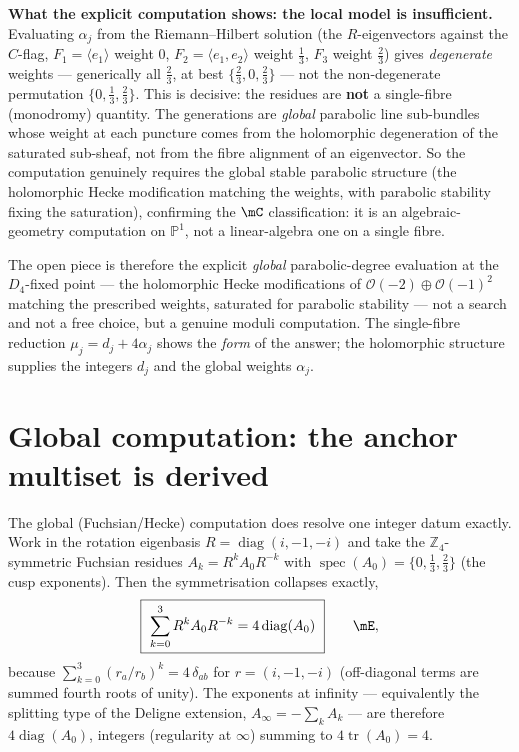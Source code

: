 \par\smallskip\noindent\textbf{What the explicit computation shows: the local model is insufficient.}
Evaluating $\alpha_j$ from the Riemann--Hilbert solution (the $R$-eigenvectors against the $C$-flag,
$F_1{=}\langle e_1\rangle$ weight $0$, $F_2{=}\langle e_1,e_2\rangle$ weight $\tfrac13$, $F_3$ weight
$\tfrac23$) gives \emph{degenerate} weights --- generically all $\tfrac23$, at best $\{\tfrac23,0,\tfrac23\}$
--- not the non-degenerate permutation $\{0,\tfrac13,\tfrac23\}$. This is decisive: the residues are
\textbf{not} a single-fibre (monodromy) quantity. The generations are \emph{global} parabolic line
sub-bundles whose weight at each puncture comes from the holomorphic degeneration of the saturated
sub-sheaf, not from the fibre alignment of an eigenvector. So the computation genuinely requires the
global stable parabolic structure (the holomorphic Hecke modification matching the weights, with
parabolic stability fixing the saturation), confirming the $\mC$ classification: it is an
algebraic-geometry computation on $\mathbb P^1$, not a linear-algebra one on a single fibre.
\par\smallskip

\noindent The open piece is therefore the explicit \emph{global} parabolic-degree evaluation at the
$D_4$-fixed point --- the holomorphic Hecke modifications of $\mathcal O(-2)\oplus\mathcal O(-1)^2$
matching the prescribed weights, saturated for parabolic stability --- not a search and not a free
choice, but a genuine moduli computation. The single-fibre reduction $\mu_j=d_j+4\alpha_j$ shows the
\emph{form} of the answer; the holomorphic structure supplies the integers $d_j$ and the global weights
$\alpha_j$.

\section{Global computation: the anchor multiset is derived}
The global (Fuchsian/Hecke) computation does resolve one integer datum exactly. Work in the rotation
eigenbasis $R=\operatorname{diag}(i,-1,-i)$ and take the $\mathbb Z_4$-symmetric Fuchsian residues
$A_k=R^kA_0R^{-k}$ with $\operatorname{spec}(A_0)=\{0,\tfrac13,\tfrac23\}$ (the cusp exponents). Then the
symmetrisation collapses exactly,
\begin{equation}
  \boxed{\ \sum_{k=0}^{3}R^kA_0R^{-k}=4\operatorname{diag}(A_0)\ }\qquad\mE ,
\end{equation}
because $\sum_{k=0}^3(r_a/r_b)^k=4\,\delta_{ab}$ for $r=(i,-1,-i)$ (off-diagonal terms are summed fourth
roots of unity). The exponents at infinity --- equivalently the splitting type of the Deligne extension,
$A_\infty=-\sum_k A_k$ --- are therefore $4\operatorname{diag}(A_0)$, integers (regularity at $\infty$)
summing to $4\operatorname{tr}(A_0)=4$.

